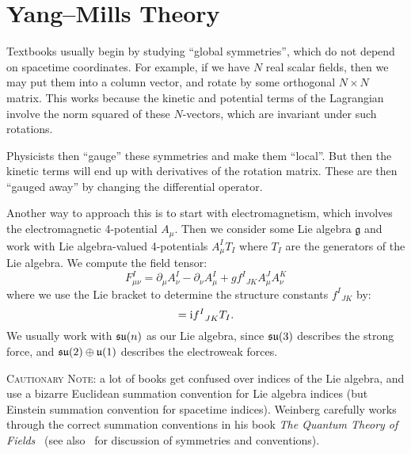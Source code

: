 \section{Yang--Mills Theory}

Textbooks usually begin by studying ``global symmetries'', which do not
depend on spacetime coordinates. For example, if we have $N$ real scalar
fields, then we may put them into a column vector, and rotate by some
orthogonal $N\times N$ matrix. This works because the kinetic and
potential terms of the Lagrangian involve the norm squared of these
$N$-vectors, which are invariant under such rotations.

Physicists then ``gauge'' these symmetries and make them ``local''. But
then the kinetic terms will end up with derivatives of the rotation
matrix. These are then ``gauged away'' by changing the differential
operator.

Another way to approach this is to start with electromagnetism, which
involves the electromagnetic 4-potential $A_{\mu}$. Then we consider
some Lie algebra $\mathfrak{g}$ and work with Lie algebra-valued
4-potentials $A_{\mu}^{I}T_{I}$ where $T_{I}$ are the generators of the
Lie algebra. We compute the field tensor:
\begin{equation}
F_{\mu\nu}^{I} = \partial_{\mu}A^{I}_{\nu} - \partial_{\nu}A^{I}_{\mu}
+g{f^{I}}_{JK}A^{J}_{\mu}A^{K}_{\nu}
\end{equation}
where we use the Lie bracket to determine the structure constants
${f^{I}}_{JK}$ by:
\begin{equation}
[T_{J}, T_{K}] = \I {f^{I}}_{JK}T_{I}.
\end{equation}
We usually work with $\mathfrak{su}(n)$ as our Lie algebra, since $\mathfrak{su}(3)$
describes the strong force, and $\mathfrak{su}(2)\oplus\mathfrak{u}(1)$ describes
the electroweak forces.

\textsc{Cautionary Note}: a lot of books get confused over indices of
the Lie algebra, and use a bizarre Euclidean summation convention for
Lie algebra indices (but Einstein summation convention for spacetime
indices). Weinberg carefully works through the correct summation
conventions in his book \textit{The Quantum Theory of Fields}~\cite[\S15.1]{Weinberg:1996kr}
(see also~\cite[\S2.2]{Weinberg:1995mt} for discussion of symmetries and
conventions).

